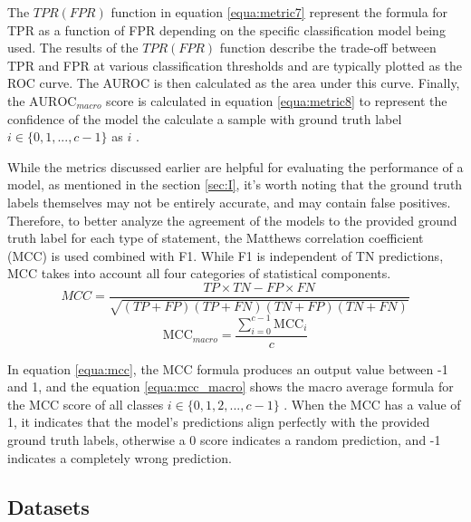 \documentclass{ieeeaccess}
\begin{document}
\par The $TPR(FPR)$ function in equation \ref{equa:metric7}   represent the formula for TPR as a function of FPR depending on the specific classification model being used.  The results of the $TPR(FPR)$ function describe the trade-off between TPR and FPR at various classification thresholds and are typically plotted as the ROC curve. The AUROC is then calculated as the area under this curve. Finally, the $\mathrm{AUROC}_{macro}$ score is calculated in equation \ref{equa:metric8} to represent the confidence of the model the calculate a sample with ground truth label $i \in \{0,1,...,c-1\}$ as $i$ .

\par While the metrics discussed earlier are helpful for evaluating the performance of a model, as mentioned  in the section \ref{sec:I}, it's worth noting that the ground truth labels themselves may not be entirely accurate, and may contain false positives. Therefore, to better analyze the agreement of the models to the provided ground truth label for each type of statement,  the Matthews correlation coefficient (MCC) is  used combined with F1. While F1 is independent of TN predictions, MCC takes into account all four categories of statistical components.
 \begin{equation}\label{equa:mcc}MCC=\frac{
 TP\times TN - FP \times FN
 }
 {
 \sqrt{(TP+FP)(TP+FN)(TN+FP)(TN+FN)}
 }\end{equation}
 \begin{equation} \label{equa:mcc_macro}
    \mathrm{MCC}_{macro} = \frac{\sum_{i=0}^{c-1} \mathrm{MCC}_i}{c}
\end{equation}
 \par In equation \ref{equa:mcc}, the MCC formula produces an output value between -1 and 1, and the equation \ref{equa:mcc_macro} shows the macro average formula for the MCC score of all classes $i\in \{0, 1, 2, ..., c - 1\}$ . When the MCC has a value of 1, it indicates that the model's predictions align perfectly with the provided ground truth labels, otherwise a 0 score indicates a random prediction, and -1 indicates a completely wrong prediction.

\subsection{Datasets} 
\end{document}
